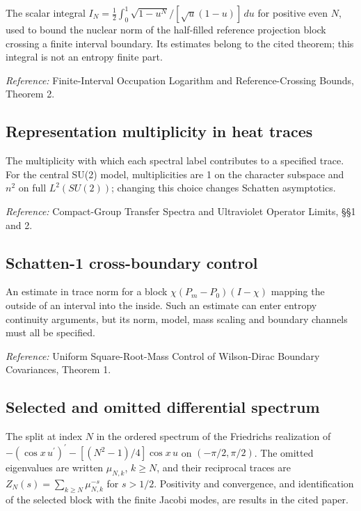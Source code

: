 \documentclass[
  10pt,
  a4paper,
]{article}
\begin{document}
The scalar integral \(I_N=\frac12\int_0^1\sqrt{1-u^N}/[\sqrt u(1-u)]\,du\) for positive even \(N\), used to bound the nuclear norm of the half-filled reference projection block crossing a finite interval boundary. Its estimates belong to the cited theorem; this integral is not an entropy finite part.

\nopagebreak[4]

\emph{Reference:} Finite-Interval Occupation Logarithm and Reference-Crossing Bounds, Theorem 2.

\subsection{Representation multiplicity in heat traces}\label{representation-multiplicity-in-heat-traces}

The multiplicity with which each spectral label contributes to a specified trace. For the central SU(2) model, multiplicities are 1 on the character subspace and \(n^2\) on full \(L^2(SU(2))\); changing this choice changes Schatten asymptotics.

\nopagebreak[4]

\emph{Reference:} Compact-Group Transfer Spectra and Ultraviolet Operator Limits, §§1 and 2.

\subsection{Schatten-1 cross-boundary control}\label{schatten-1-cross-boundary-control}

An estimate in trace norm for a block \(\chi(P_m-P_0)(I-\chi)\) mapping the outside of an interval into the inside. Such an estimate can enter entropy continuity arguments, but its norm, model, mass scaling and boundary channels must all be specified.

\nopagebreak[4]

\emph{Reference:} Uniform Square-Root-Mass Control of Wilson-Dirac Boundary Covariances, Theorem 1.

\subsection{Selected and omitted differential spectrum}\label{selected-and-omitted-differential-spectrum}

The split at index \(N\) in the ordered spectrum of the Friedrichs realization of \(-(\cos x\,u^{\prime})^{\prime}-[(N^2-1)/4]\cos x\,u\) on \((-\pi/2,\pi/2)\). The omitted eigenvalues are written \(\mu_{N,k}\), \(k\ge N\), and their reciprocal traces are \(Z_N(s)=\sum_{k\ge N}\mu_{N,k}^{-s}\) for \(s>1/2\). Positivity and convergence, and identification of the selected block with the finite Jacobi modes, are results in the cited paper.
\end{document}
